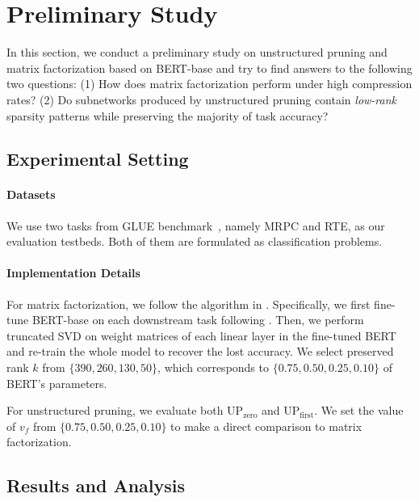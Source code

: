  


\section{Preliminary Study}
\label{sec:pilot}
In this section, we conduct a preliminary study on unstructured pruning  and matrix factorization
based on BERT-base and try to find answers to the following two questions: (1) How does matrix factorization perform under high compression rates? (2) Do subnetworks produced by unstructured pruning contain \textit{low-rank} sparsity patterns while preserving the majority of task accuracy?

\subsection{Experimental Setting}
\indent
\paragraph{Datasets}We use two tasks from GLUE benchmark~\cite{glue}, namely MRPC and RTE, as our evaluation testbeds. Both of them are formulated as classification problems.

\paragraph{Implementation Details} For matrix factorization, we follow the algorithm in . Specifically, we first fine-tune BERT-base on each downstream task following \citet{bert}. Then, we perform truncated SVD on weight matrices of each linear layer in the fine-tuned BERT and re-train the whole model to recover the lost accuracy. We select preserved rank $k$ from $\{390, 260, 130, 50\}$, which corresponds to $\{0.75, 0.50, 0.25, 0.10\}$ of BERT's parameters.

For unstructured  pruning, we evaluate both UP$_\text{zero}$ and UP$_\text{first}$. We set the value of $v_f$ from $\{0.75, 0.50, 0.25, 0.10\}$ to make a direct comparison to matrix factorization.

\subsection{Results and Analysis}
\label{sec:pilot_results}

